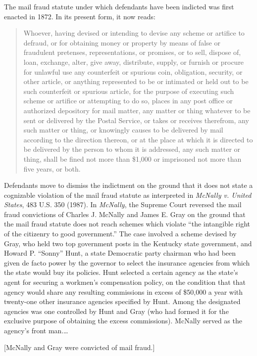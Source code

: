 The mail fraud statute under which defendants have been indicted was first
enacted in 1872. In its present form, it now reads:
\begin{quote}
Whoever, having devised or intending to devise any scheme or artifice to
defraud, or for obtaining money or property by means of false or fraudulent
pretenses, representations, or promises, or to sell, dispose of, loan,
exchange, alter, give away, distribute, supply, or furnish or procure for
unlawful use any counterfeit or spurious coin, obligation, security, or other
article, or anything represented to be or intimated or held out to be such
counterfeit or spurious article, for the purpose of executing such scheme or
artifice or attempting to do so, places in any post office or authorized
depository for mail matter, any matter or thing whatever to be sent or
delivered by the Postal Service, or takes or receives therefrom, any such
matter or thing, or knowingly causes to be delivered by mail according to the
direction thereon, or at the place at which it is directed to be delivered by
the person to whom it is addressed, any such matter or thing, shall be fined
not more than \$1,000 or imprisoned not more than five years, or both.
\end{quote}

Defendants move to dismiss the indictment on the ground that it does not state a
cognizable violation of the mail fraud statute as interpreted in
\textit{McNally v. United States}, 483 U.S. 350 (1987). In \textit{McNally},
the Supreme Court reversed the mail fraud convictions of Charles J. McNally and
James E. Gray on the ground that the mail fraud statute does not reach schemes
which violate ``the intangible right of the citizenry to good government.'' The
case involved a scheme devised by Gray, who held two top government posts in
the Kentucky state government, and Howard P. ``Sonny'' Hunt, a state Democratic
party chairman who had been given de facto power by the governor to select the
insurance agencies from which the state would buy its policies. Hunt selected a
certain agency as the state's agent for securing a workmen's compensation
policy, on the condition that that agency would share any resulting commissions
in excess of \$50,000 a year with twenty-one other insurance agencies specified
by Hunt. Among the designated agencies was one controlled by Hunt and Gray (who
had formed it for the exclusive purpose of obtaining the excess commissions).
McNally served as the agency's front man.\ldots

[McNally and Gray were convicted of mail fraud.]

